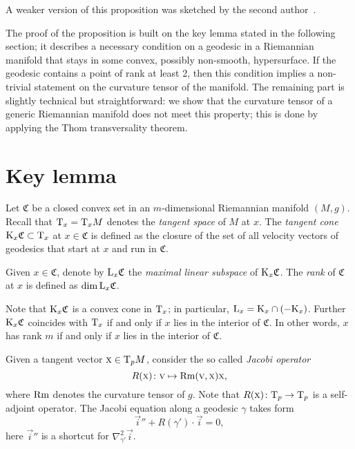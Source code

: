 \documentclass[a4paper,10pt]{article}
\begin{document}
A  weaker version of this proposition was sketched by the second author~\cite{petrunin-2009}.  

The proof of the proposition is built on the key lemma stated in the following section;   
it describes a necessary condition on a geodesic in a Riemannian manifold that stays
in some convex, possibly non-smooth, hypersurface.
If the geodesic contains a point of rank at least 2, then this condition implies a non-trivial
statement on the curvature tensor of the manifold.
The remaining part is slightly technical but straightforward: we show that the curvature tensor of a generic Riemannian manifold does not meet this property; this is done by applying the Thom transversality theorem.


\section{Key lemma}


Let $\mathfrak{C}$ be a closed convex set in an $m$-dimensional Riemannian manifold $(M,g)$.
Recall that $\mathrm{T}_x=\mathrm{T}_xM$ denotes the \emph{tangent space} of $M$ at $x$.
The \emph{tangent cone} $\mathrm{K}_x\mathfrak{C}\subset \mathrm{T}_x$ at $x\in\mathfrak{C}$ is defined as the closure of the set of all velocity vectors of geodesics that start at $x$ and run in $\mathfrak{C}$.

Given $x\in \mathfrak{C}$, denote by $\mathrm{L}_x\mathfrak{C}$ the \emph{maximal linear subspace} of $\mathrm{K}_x\mathfrak{C}$.
The \emph{rank} of $\mathfrak{C}$ at $x$ is defined as $\operatorname{\rm dim} \mathrm{L}_x\mathfrak{C}$.

Note that $\mathrm{K}_x\mathfrak{C}$ is a convex cone in $\mathrm{T}_x$; in particular, $\mathrm{L}_x=\mathrm{K}_x\cap (-\mathrm{K}_x)$.
Further $\mathrm{K}_x\mathfrak{C}$ coincides with 
$\mathrm{T}_x$ if and only if
$x$ lies in the interior of $\mathfrak{C}$.
In other words, $x$ has rank $m$ if and only if $x$ lies in the interior of $\mathfrak{C}$.%


Given a tangent vector $\text{\sc{x}}\in\mathrm{T}_pM$, consider the so called \emph{Jacobi operator}
\[R(\text{\sc{x}})\colon\text{\sc{v}}\mapsto \operatorname{\rm Rm}(\text{\sc{v}},\text{\sc{x}})\text{\sc{x}},\]
where $\operatorname{\rm Rm}$ denotes the curvature tensor of $g$.
Note that $R(\text{\sc{x}})\colon\mathrm{T}_p\to \mathrm{T}_p$ is a self-adjoint operator.
The Jacobi equation along a geodesic $\gamma$ takes form 
\[\vec{i}''+R(\gamma')\cdot \vec{i}=0,\]
here $\vec{i}''$ is a shortcut for $\nabla^2_{\gamma'}\vec{i}$.
\end{document}
